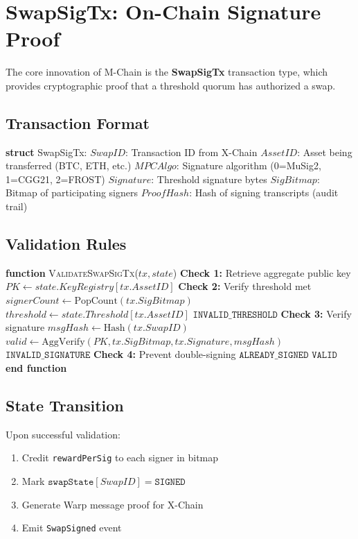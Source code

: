 \section{SwapSigTx: On-Chain Signature Proof}


The core innovation of M-Chain is the \textbf{SwapSigTx} transaction type, which provides cryptographic proof that a threshold quorum has authorized a swap.

\subsection{Transaction Format}



\begin{algorithmic}[1]
\State \textbf{struct} SwapSigTx:
\State \quad $SwapID$: Transaction ID from X-Chain
\State \quad $AssetID$: Asset being transferred (BTC, ETH, etc.)
\State \quad $MPCAlgo$: Signature algorithm (0=MuSig2, 1=CGG21, 2=FROST)
\State \quad $Signature$: Threshold signature bytes
\State \quad $SigBitmap$: Bitmap of participating signers
\State \quad $ProofHash$: Hash of signing transcripts (audit trail)
\end{algorithmic}


\subsection{Validation Rules}



\begin{algorithmic}[1]
\State \textbf{function} \textsc{ValidateSwapSigTx}($tx, state$)
    \State \textbf{Check 1:} Retrieve aggregate public key
    \State $PK \gets state.KeyRegistry[tx.AssetID]$
    \State
    \State \textbf{Check 2:} Verify threshold met
    \State $signerCount \gets \text{PopCount}(tx.SigBitmap)$
    \State $threshold \gets state.Threshold[tx.AssetID]$
        \State \Return $\texttt{INVALID\_THRESHOLD}$
    \EndIf
    \State
    \State \textbf{Check 3:} Verify signature
    \State $msgHash \gets \text{Hash}(tx.SwapID)$
    \State $valid \gets \text{AggVerify}(PK, tx.SigBitmap, tx.Signature, msgHash)$
        \State \Return $\texttt{INVALID\_SIGNATURE}$
    \EndIf
    \State
    \State \textbf{Check 4:} Prevent double-signing
        \State \Return $\texttt{ALREADY\_SIGNED}$
    \EndIf
    \State
    \State \Return $\texttt{VALID}$
\State \textbf{end function}
\end{algorithmic}


\subsection{State Transition}

Upon successful validation:
\begin{enumerate}
\item Credit \texttt{rewardPerSig} to each signer in bitmap
\item Mark $\texttt{swapState}[SwapID] = \texttt{SIGNED}$
\item Generate Warp message proof for X-Chain
\item Emit \texttt{SwapSigned} event
\end{enumerate}

